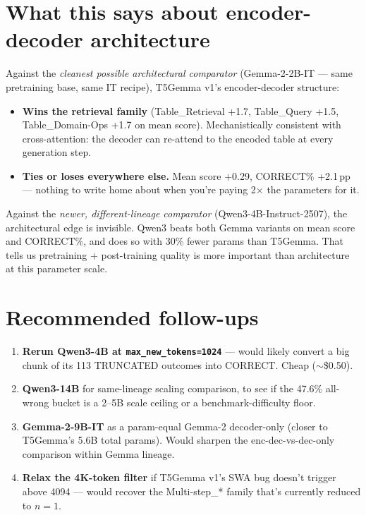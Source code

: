 \documentclass[11pt]{article}
\begin{document}
\section{What this says about encoder-decoder architecture}

Against the \emph{cleanest possible architectural comparator}
(Gemma-2-2B-IT --- same pretraining base, same IT recipe), T5Gemma v1's
encoder-decoder structure:

\begin{itemize}
  \item \textbf{Wins the retrieval family} (Table\_Retrieval +1.7,
        Table\_Query +1.5, Table\_Domain-Ops +1.7 on mean score).
        Mechanistically consistent with cross-attention: the decoder can
        re-attend to the encoded table at every generation step.
  \item \textbf{Ties or loses everywhere else.} Mean score +0.29, CORRECT\%
        +2.1\,pp --- nothing to write home about when you're paying 2$\times$ the
        parameters for it.
\end{itemize}

Against the \emph{newer, different-lineage comparator}
(Qwen3-4B-Instruct-2507), the architectural edge is invisible. Qwen3
beats both Gemma variants on mean score and CORRECT\%, and does so with
30\% fewer params than T5Gemma. That tells us pretraining + post-training
quality is more important than architecture at this parameter scale.

\section{Recommended follow-ups}

\begin{enumerate}
  \item \textbf{Rerun Qwen3-4B at \texttt{max\_new\_tokens=1024}} --- would likely
        convert a big chunk of its 113 TRUNCATED outcomes into CORRECT. Cheap ($\sim$\$0.50).
  \item \textbf{Qwen3-14B} for same-lineage scaling comparison, to see if the
        47.6\% all-wrong bucket is a 2--5B scale ceiling or a benchmark-difficulty floor.
  \item \textbf{Gemma-2-9B-IT} as a param-equal Gemma-2 decoder-only (closer to
        T5Gemma's 5.6B total params). Would sharpen the enc-dec-vs-dec-only
        comparison within Gemma lineage.
  \item \textbf{Relax the 4K-token filter} if T5Gemma v1's SWA bug doesn't
        trigger above 4094 --- would recover the Multi-step\_* family that's
        currently reduced to $n{=}1$.
\end{enumerate}
\end{document}
